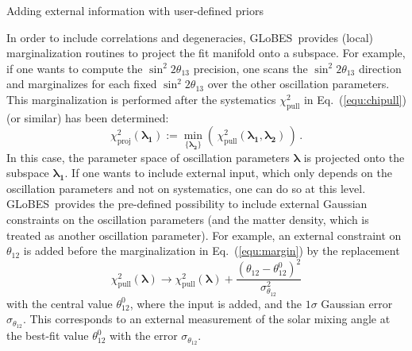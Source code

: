 \documentclass[12pt,a4paper]{article}
\makeatletter
\renewcommand{\section}{\@startsection{section}{1}{0em}{-\baselineskip}%
{\baselineskip}{\normalfont\large\bfseries}}
\newcommand{\eq}{Eq.}
\newcommand{\stheta}{\sin^2 2 \theta_{13}}
\newcommand{\GLOBES}{{\sf GLoBES}}
\newcommand{\equ}[1]{\eq~(\ref{equ:#1})}
\makeatother
\begin{document}
\section{Adding external information with user-defined priors}

In order to include correlations and degeneracies, \GLOBES\ provides
(local) marginalization routines to project the fit manifold onto
a subspace. For example, if one wants to compute the $\stheta$ precision,
one scans the $\stheta$ direction and marginalizes for each fixed $\stheta$
over the other oscillation parameters. This marginalization is performed
after the systematics $\chi^2_{\mathrm{pull}}$ in \equ{chipull} (or similar) 
has been determined:
\begin{equation}
 \chi^2_{\mathrm{proj}}(\boldsymbol{\lambda_1}) := \min_{\{ \boldsymbol{\lambda_2} \} } \left( \, \chi^2_{\mathrm{pull}} (\boldsymbol{\lambda_1} , \boldsymbol{\lambda_2} ) \, \right) \, .
\label{equ:margin}
\end{equation}
In this case, the parameter space of oscillation parameters 
$\boldsymbol{\lambda}$ is projected onto the subspace $\boldsymbol{\lambda_1}$.
If one wants to include external input, which only depends on the oscillation
parameters and not on systematics, one can do so at this level. \GLOBES\ provides
the pre-defined possibility to include external Gaussian constraints on the 
oscillation parameters (and the matter density, which is treated as another
oscillation parameter). For example, an external constraint on $\theta_{12}$
is added before the marginalization in \equ{margin} by the replacement
\begin{equation}
 \chi^2_{\mathrm{pull}}(\boldsymbol{\lambda}) \rightarrow \chi^2_{\mathrm{pull}}(\boldsymbol{\lambda})  +
 \frac{(\theta_{12} - \theta_{12}^0)^2}{\sigma_{\theta_{12}}^2}
\label{equ:priors}
\end{equation}
with the central value $\theta_{12}^0$, where the input is added, and
the $1\sigma$ Gaussian error $\sigma_{\theta_{12}}$. This corresponds to an external
measurement of the solar mixing angle at the best-fit value $\theta_{12}^0$
with the error $\sigma_{\theta_{12}}$. 
\end{document}
